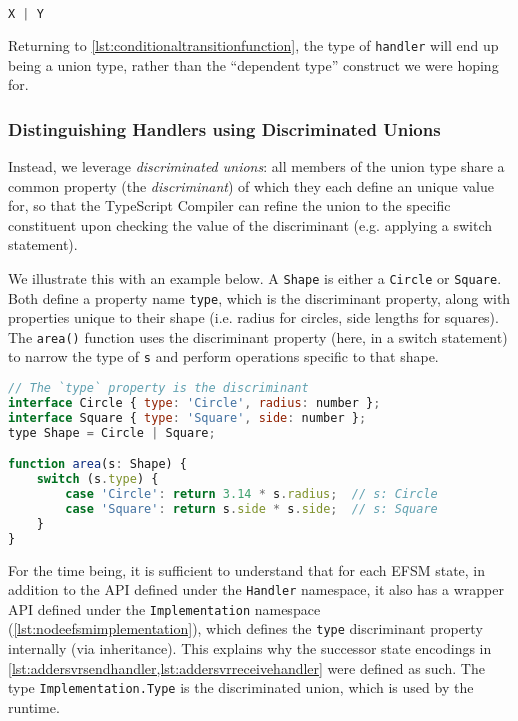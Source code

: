 \begin{lstlisting}[language=javascript,numbers=none]
X | Y
\end{lstlisting}

Returning to \cref{lst:conditionaltransitionfunction}, 
the type of \texttt{handler} will end up being a union type, 
rather than the ``dependent type''
construct we were hoping for.

\subsubsection{Distinguishing Handlers using Discriminated Unions}

Instead, we leverage \textit{discriminated unions}: all members
of the union type share a common property (the \textit{discriminant})
of which they each define an
unique value for, so that the TypeScript Compiler can refine the union
to the specific constituent upon checking the value of the discriminant
(e.g. applying a switch statement).

We illustrate this with an example below.
A \texttt{Shape} is either a \texttt{Circle} or \texttt{Square}.
Both define a property name \texttt{type}, which is the discriminant
property, along with properties unique to their shape
(i.e. radius for circles, side lengths for squares).
The \texttt{area()} function uses the discriminant property
(here, in a switch statement) to narrow the type of \texttt{s}
and perform operations specific to that shape.

\begin{lstlisting}[language=javascript]
// The `type` property is the discriminant
interface Circle { type: 'Circle', radius: number };
interface Square { type: 'Square', side: number };
type Shape = Circle | Square;

function area(s: Shape) {
	switch (s.type) {
		case 'Circle': return 3.14 * s.radius;	// s: Circle
		case 'Square': return s.side * s.side;	// s: Square
	}
}
\end{lstlisting}

For the time being,
it is sufficient to understand that for each EFSM state,
in addition to the API defined under the
\texttt{Handler} namespace, it also has a wrapper API defined under
the \texttt{Implementation} namespace (\cref{lst:nodeefsmimplementation}),
which defines the \texttt{type}
discriminant property internally (via inheritance).
This explains why the successor
state encodings in 
\cref{lst:addersvrsendhandler,lst:addersvrreceivehandler}
were defined as such.
The type \texttt{Implementation.Type} is the discriminated union,
which is used by the runtime.


